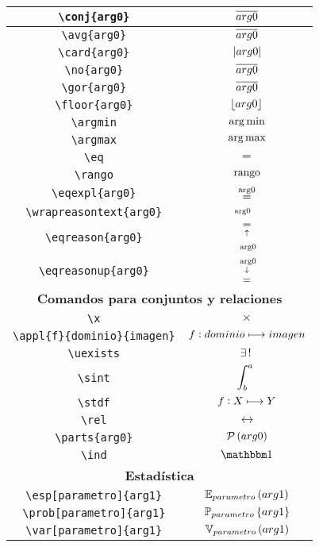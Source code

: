 \begin{longtable}{|c|c|}
\verb|\conj{arg0}| & $\displaystyle\overline{arg0}$ \\ \hline 
\verb|\avg{arg0}| & $\displaystyle\overline{arg0}$ \\ \hline 
\verb|\card{arg0}| & $\displaystyle\left\vert arg0 \right\vert$ \\ \hline 
\verb|\no{arg0}| & $\displaystyle\overline{arg0}$ \\ \hline 
\verb|\gor{arg0}| & $\displaystyle\overline{arg0}$ \\ \hline 
\verb|\floor{arg0}| & $\displaystyle\left\lfloor arg0 \right\rfloor$ \\ \hline 
\verb|\argmin| & $\displaystyle\operatorname*{arg\,min}$ \\ \hline 
\verb|\argmax| & $\displaystyle\operatorname*{arg\,max}$ \\ \hline 
\verb|\eq| & $\displaystyle=$ \\ \hline 
\verb|\rango| & $\displaystyle\operatorname{rango}$ \\ \hline 
\verb|\eqexpl{arg0}| & $\displaystyle\eqexpl{arg0}$ \\ \hline 
\verb|\wrapreasontext{arg0}| & $\displaystyle\wrapreasontext{arg0}$ \\ \hline 
\verb|\eqreason{arg0}| & $\displaystyle\eqreason{arg0}$ \\ \hline 
\verb|\eqreasonup{arg0}| & $\displaystyle\eqreasonup{arg0}$ \\ \hline 
\multicolumn{2}{|c|}{\textbf{Comandos para conjuntos y relaciones}} \\ \hline 
\verb|\x| & $\displaystyle\times$ \\ \hline 
\verb|\appl{f}{dominio}{imagen}| & $\displaystyle f : dominio\longmapsto imagen$ \\ \hline 
\verb|\uexists| & $\displaystyle\exists\, !\;$ \\ \hline 
\verb|\sint| & $\displaystyle\int_b^a\;$ \\ \hline 
\verb|\stdf| & $\displaystyle f : X\longmapsto Y$ \\ \hline 
\verb|\rel| & $\displaystyle\rel$ \\ \hline 
\verb|\parts{arg0}| & $\displaystyle\mathcal{P}\left(arg0\right)$ \\ \hline 
\verb|\ind| & $\displaystyle\ind$ \\ \hline 
\multicolumn{2}{|c|}{\textbf{Estadística}} \\ \hline 
\verb|\esp[parametro]{arg1}| & $\displaystyle\esp[parametro]{arg1}$ \\ \hline 
\verb|\prob[parametro]{arg1}| & $\displaystyle\prob[parametro]{arg1}$ \\ \hline 
\verb|\var[parametro]{arg1}| & $\displaystyle\var[parametro]{arg1}$ \\ \hline 

\end{longtable}
